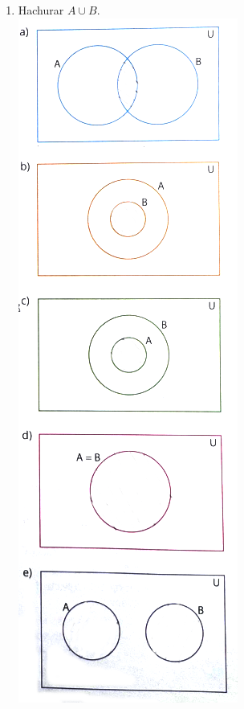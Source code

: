 \documentclass[a4paper,14pt]{article}
\begin{document}
\begin{multicols}{2}
\begin{enumerate}
    			\item Hachurar $A \cup B$. \\
    			\includegraphics[width=1\linewidth]{6FMA52_imagens/imagem2} \newpage

\end{enumerate}
\end{multicols}
\end{document}
